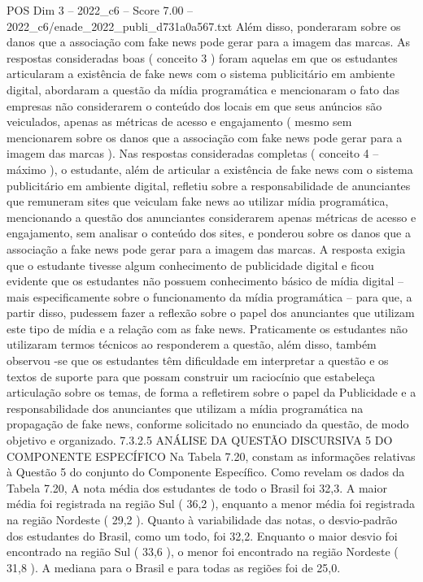 \begin{textsample}{POS Dim 3 – 2022\_c6 – Score 7.00 – 2022\_c6/enade\_2022\_publi\_d731a0a567.txt}
Além disso, ponderaram sobre os danos que a associação com fake news pode gerar para a imagem das marcas.
As respostas consideradas boas ( conceito 3 ) foram aquelas em que os estudantes articularam a existência de fake news com o sistema publicitário em ambiente digital, abordaram a questão da mídia programática e mencionaram o fato das empresas não considerarem o conteúdo dos locais em que seus anúncios são veiculados, apenas as métricas de acesso e engajamento ( mesmo sem mencionarem sobre os danos que a associação com fake news pode gerar para a imagem das marcas ).
Nas respostas consideradas completas ( conceito 4 – máximo ), o estudante, além de articular a existência de fake news com o sistema publicitário em ambiente digital, refletiu sobre a responsabilidade de anunciantes que remuneram sites que veiculam fake news ao utilizar mídia programática, mencionando a questão dos anunciantes considerarem apenas métricas de acesso e engajamento, sem analisar o conteúdo dos sites, e ponderou sobre os danos que a associação a fake news pode gerar para a imagem das marcas.
A resposta exigia que o estudante tivesse algum conhecimento de publicidade digital e ficou evidente que os estudantes não possuem conhecimento básico de mídia digital – mais especificamente sobre o funcionamento da mídia programática – para que, a partir disso, pudessem fazer a reflexão sobre o papel dos anunciantes que utilizam este tipo de mídia e a relação com as fake news.
Praticamente os estudantes não utilizaram termos técnicos ao responderem a questão, além disso, também observou -se que os estudantes têm dificuldade em interpretar a questão e os textos de suporte para que possam construir um raciocínio que estabeleça articulação sobre os temas, de forma a refletirem sobre o papel da Publicidade e a responsabilidade dos anunciantes que utilizam a mídia programática na propagação de fake news, conforme solicitado no enunciado da questão, de modo objetivo e organizado. 7.3.2.5 ANÁLISE DA QUESTÃO DISCURSIVA 5 DO COMPONENTE ESPECÍFICO Na Tabela 7.20, constam as informações relativas à Questão 5 do conjunto do Componente Específico.
Como revelam os dados da Tabela 7.20, A nota média dos estudantes de todo o Brasil foi 32,3.
A maior média foi registrada na região Sul ( 36,2 ), enquanto a menor média foi registrada na região Nordeste ( 29,2 ).
Quanto à variabilidade das notas, o desvio-padrão dos estudantes do Brasil, como um todo, foi 32,2.
Enquanto o maior desvio foi encontrado na região Sul ( 33,6 ), o menor foi encontrado na região Nordeste ( 31,8 ).
A mediana para o Brasil e para todas as regiões foi de 25,0.

\end{textsample}
